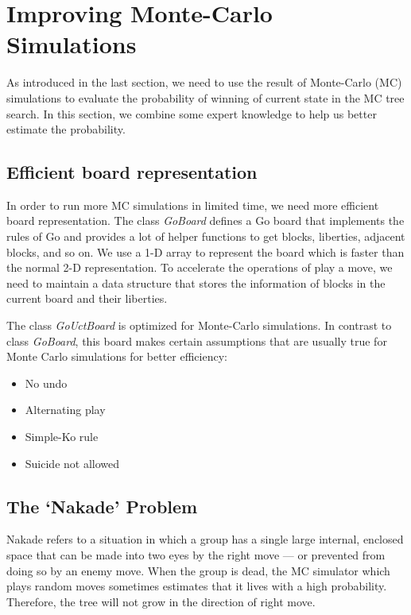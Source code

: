 
\section{Improving Monte-Carlo Simulations}

As introduced in the last section, we need to use the result of Monte-Carlo (MC) simulations to evaluate the probability of winning of current state in the MC tree search. In this section, we combine some expert knowledge to help us better estimate the probability.

\subsection{Efficient board representation}

In order to run more MC simulations in limited time, we need more efficient board representation. The class \emph{GoBoard} defines a Go board that implements the rules of Go and provides a lot of helper functions to get blocks, liberties, adjacent blocks, and so on. We use a 1-D array to represent the board which is faster than the normal 2-D representation. To accelerate the operations of play a move, we need to maintain a data structure that stores the information of blocks in the current board and their liberties.

The class \emph{GoUctBoard} is optimized for Monte-Carlo simulations. In contrast to class \emph{GoBoard}, this board makes certain assumptions that are usually true for Monte Carlo simulations for better efficiency:
\begin{itemize}
  \item No undo
  \item Alternating play
  \item Simple-Ko rule
  \item Suicide not allowed
\end{itemize}

\subsection{The `Nakade' Problem}

Nakade refers to a situation in which a group has a single large internal, enclosed space that can be made into two eyes by the right move --- or prevented from doing so by an enemy move. When the group is dead, the MC simulator which plays random moves sometimes estimates that it lives with a high probability. Therefore, the tree will not grow in the direction of right move. 

